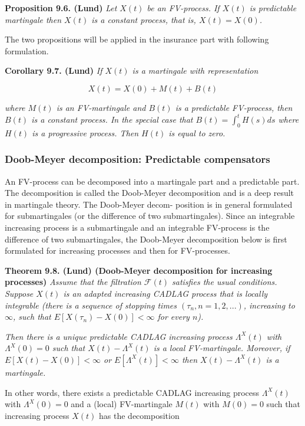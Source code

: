 \documentclass[a4paper,10pt,openany]{book}
\begin{document}
\textbf{Proposition 9.6. (Lund)} \emph{Let \(X(t)\) be an FV-process. If \(X(t)\) is predictable martingale then \(X(t)\) is a constant process, that is, \(X(t) = X(0)\).}

The two propositions will be applied in the insurance part with following formulation.

\textbf{Corollary 9.7. (Lund)} \emph{If \(X(t)\) is a martingale with representation}

\[
X(t)=X(0)+M(t)+B(t)
\]

\emph{where \(M(t)\) is an FV-martingale and \(B(t)\) is a predictable FV-process, then \(B(t)\) is a constant process. In the special case that \(B(t) = \int_0^tH(s) ds\) where \(H(t)\) is a progressive process. Then \(H(t)\) is equal to zero.}

\hypertarget{doob-meyer-decomposition-predictable-compensators}{%
\subsubsection{Doob-Meyer decomposition: Predictable compensators}\label{doob-meyer-decomposition-predictable-compensators}}

An FV-process can be decomposed into a martingale part and a predictable part. The decomposition is called the Doob-Meyer decomposition and is a deep result in martingale theory. The Doob-Meyer decom- position is in general formulated for submartingales (or the difference of two submartingales). Since an integrable increasing process is a submartingale and an integrable FV-process is the difference of two submartingales, the Doob-Meyer decomposition below is first formulated for increasing processes and then for FV-processes.

\textbf{Theorem 9.8. (Lund) (Doob-Meyer decomposition for increasing processes)} \emph{Assume that the filtration \(\mathcal F(t)\) satisfies the usual conditions. Suppose \(X(t)\) is an adapted increasing CADLAG process that is locally integrable (there is a sequence of stopping times \((\tau_n, n = 1, 2, . . .)\), increasing to \(\infty\), such that \(E[X (\tau_n ) − X (0)] < \infty\) for every \(n\)).}

\emph{Then there is a unique predictable CADLAG increasing process \(\Lambda^X(t)\) with \(\Lambda^X(0) = 0\) such that \(X(t) − \Lambda^X(t)\) is a local FV-martingale. Moreover, if \(E[X(t) − X(0)] < \infty\) or \(E[\Lambda^X(t)] < \infty\) then \(X(t) − \Lambda^X(t)\) is a martingale.}

In other words, there exists a predictable CADLAG increasing process \(\Lambda^X(t)\) with \(\Lambda^X(0) = 0\) and a (local) FV-martingale \(M(t)\) with \(M(0) = 0\) such that increasing process \(X(t)\) has the decomposition
\end{document}
